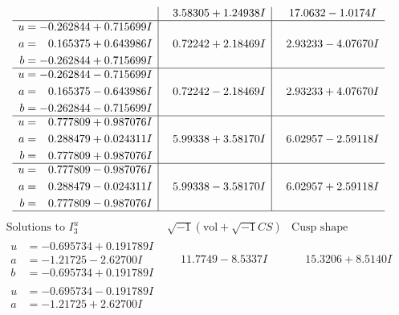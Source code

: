 \documentclass[1p]{elsarticle_modified}
\theoremstyle{definition}
\newcommand{\I}{\sqrt{-1}}
\begin{document}
$$\begin{array}{c|c|c}
 & \phantom{-}3.58305 + 1.24938 I & \phantom{-}17.0632 - 1.0174 I \\ \hline\begin{aligned}
u &= -0.262844 + 0.715699 I \\
a &= \phantom{-}0.165375 + 0.643986 I \\
b &= -0.262844 + 0.715699 I\end{aligned}
 & \phantom{-}0.72242 + 2.18469 I & \phantom{-}2.93233 - 4.07670 I \\ \hline\begin{aligned}
u &= -0.262844 - 0.715699 I \\
a &= \phantom{-}0.165375 - 0.643986 I \\
b &= -0.262844 - 0.715699 I\end{aligned}
 & \phantom{-}0.72242 - 2.18469 I & \phantom{-}2.93233 + 4.07670 I \\ \hline\begin{aligned}
u &= \phantom{-}0.777809 + 0.987076 I \\
a &= \phantom{-}0.288479 + 0.024311 I \\
b &= \phantom{-}0.777809 + 0.987076 I\end{aligned}
 & \phantom{-}5.99338 + 3.58170 I & \phantom{-}6.02957 - 2.59118 I \\ \hline\begin{aligned}
u &= \phantom{-}0.777809 - 0.987076 I \\
a &= \phantom{-}0.288479 - 0.024311 I \\
b &= \phantom{-}0.777809 - 0.987076 I\end{aligned}
 & \phantom{-}5.99338 - 3.58170 I & \phantom{-}6.02957 + 2.59118 I\\
 \hline 
 \end{array}$$\newpage$$\begin{array}{c|c|c}  
\text{Solutions to }I^u_{3}& \I (\text{vol} + \sqrt{-1}CS) & \text{Cusp shape}\\
 \hline 
\begin{aligned}
u &= -0.695734 + 0.191789 I \\
a &= -1.21725 - 2.62700 I \\
b &= -0.695734 + 0.191789 I\end{aligned}
 & \phantom{-}11.7749 - 8.5337 I & \phantom{-}15.3206 + 8.5140 I \\ \hline\begin{aligned}
u &= -0.695734 - 0.191789 I \\
a &= -1.21725 + 2.62700 I \\

\end{aligned}
\end{array}$$
\end{document}
